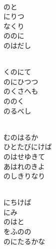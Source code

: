 \documentclass[10pt,b5j]{tarticle} %
\begin{document}
\vspace{1.5em} %
\newcommand{\linespace}{0.5em} %
\newcommand{\blocksize}{0.5\hsize} %
\newcommand{\itemmargin}{6em} %
\begin{enumerate} %
    \setlength{\itemindent}{\itemmargin} %
    \begin{minipage}[c]{\blocksize}
    
        \vspace{\linespace}
        \item~\\
        のと\\
        にりつ\\
        なくり\\
        ののに\\
        のはだし
        
        \vspace{\linespace}
        \item~\\
        くのにて\\
        のにひつつ\\
        のくさへも\\
        ののく\\
        のるべし
        
        \vspace{\linespace}
        \item~\\
        むのはるか\\
        ひとたびにけば\\
        のはせゆきて\\
        あはれのきよ\\
        のしきりなり
        
        \vspace{\linespace}
        \item~\\
        にちけば\\
        にみ\\
        のはと\\
        をふのの\\
        のにたるかな
        

\end{minipage}
\end{enumerate}
\end{document}
